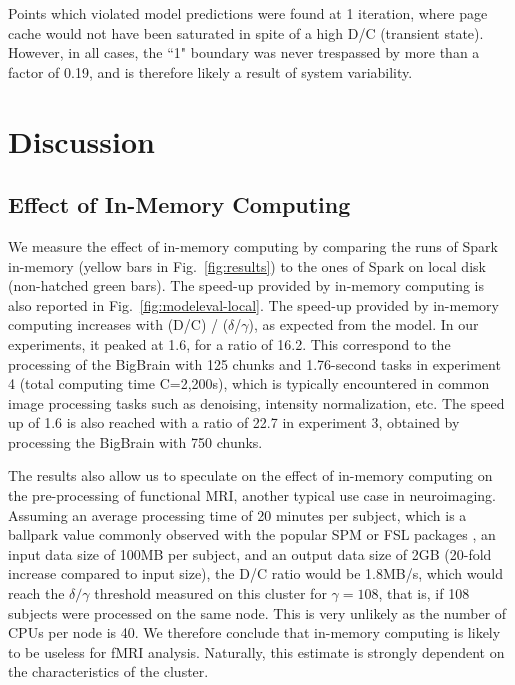 \documentclass{IEEEtran}
\newcommand{\todo}[1]{\marginpar{\parbox{18mm}{\flushleft\tiny\color{red}\textbf{TODO}:
      #1}}}
\begin{document}
Points which violated 
model predictions were found at 1 iteration, where page cache would not 
have been saturated in spite of a high D/C (transient state). However, 
in all cases, the ``1" boundary was never trespassed by more than a 
factor of 0.19, and is therefore likely a result of system variability.

\section{Discussion} %
\label{sec:discussion}

\subsection{Effect of In-Memory Computing}
We measure the effect of in-memory computing by comparing the runs 
of Spark in-memory (yellow bars in Fig.~\ref{fig:results}) to the ones 
of Spark on local disk (non-hatched green bars). The speed-up provided 
by in-memory computing is also reported in 
Fig.~\ref{fig:modeleval-local}. The speed-up provided by in-memory 
computing increases with (D/C) / ($\delta$/$\gamma$), as expected from 
the model. In our experiments, it peaked at 1.6, for a ratio of 16.2. 
This correspond to the processing of the BigBrain with 125 chunks and 
1.76-second tasks in experiment 4 (total computing time C=2,200s), 
which is typically encountered in common image processing tasks such as 
denoising, intensity normalization, etc. The speed up of 1.6 is also 
reached with a ratio of 22.7 in experiment 3, obtained by processing 
the BigBrain with 750 chunks.

The results also allow us to speculate on the effect of in-memory 
computing on the pre-processing of functional MRI, another typical use 
case in neuroimaging. Assuming an average processing time of 20 minutes 
per subject, which is a ballpark value commonly observed with the 
popular SPM or FSL packages \todo{add refs}, an input data size of 100MB per subject, 
and an output data size of 2GB (20-fold increase compared to input 
size), the D/C ratio would be 1.8MB/s, which would reach the 
$\delta/\gamma$ threshold measured on this cluster for $\gamma=108$, 
that is, if 108 subjects were processed on the same node. This is very 
unlikely as the number of CPUs per node is 40. We therefore conclude 
that in-memory computing is likely to be useless for fMRI analysis.
Naturally, this estimate is strongly dependent on the characteristics of the cluster.
\end{document}
